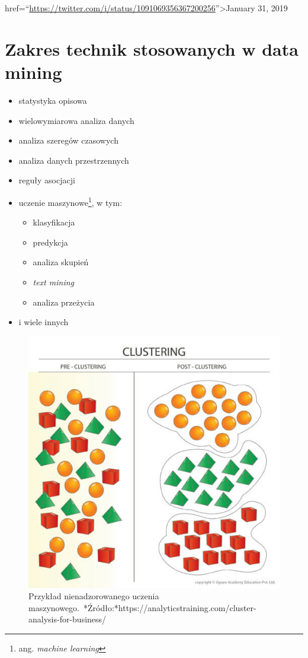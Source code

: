 \documentclass[
]{book}
\providecommand{\tightlist}{%
  \setlength{\itemsep}{0pt}\setlength{\parskip}{0pt}}
\theoremstyle{plain}
\theoremstyle{definition}
\theoremstyle{definition}
\theoremstyle{definition}
\theoremstyle{definition}
\theoremstyle{definition}
\theoremstyle{remark}
\begin{document}
href=``\url{https://twitter.com/i/status/1091069356367200256}''\textgreater January 31, 2019

\section*{Zakres technik stosowanych w data mining}\label{zakres-technik-stosowanych-w-data-mining}

\begin{itemize}
\tightlist
\item
  statystyka opisowa
\item
  wielowymiarowa analiza danych
\item
  analiza szeregów czasowych
\item
  analiza danych przestrzennych
\item
  reguły asocjacji
\item
  uczenie maszynowe\footnote{ang. \emph{machine learning}}, w tym:

  \begin{itemize}
  \tightlist
  \item
    klasyfikacja
  \item
    predykcja
  \item
    analiza skupień
  \item
    \emph{text mining}
  \item
    analiza przeżycia
  \end{itemize}
\item
  i wiele innych
\end{itemize}

\begin{figure}
\includegraphics[width=5in]{images/cluster1} \caption{Przykład nienadzorowanego uczenia maszynowego.\  *Źródło:*https://analyticstraining.com/cluster-analysis-for-business/}\label{fig:cluster1}
\end{figure}
\end{document}
